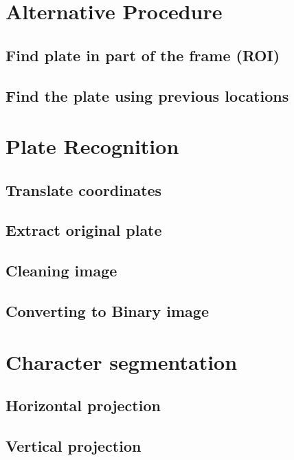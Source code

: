 \documentclass{standalone}
\begin{document}
\section{Alternative Procedure}
\subsection{Find plate in part of the frame (ROI)}
\subsection{Find the plate using previous locations}

\section{Plate Recognition}
\subsection{Translate coordinates}
\subsection{Extract original plate}
\subsection{Cleaning image}
\subsection{Converting to Binary image}

\section{Character segmentation}
\subsection{Horizontal projection}
\subsection{Vertical projection}
\end{document}
